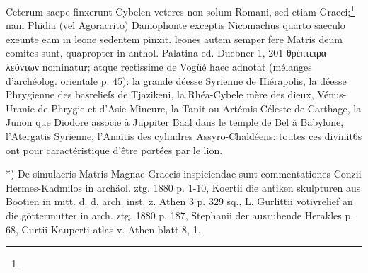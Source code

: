 \documentclass[a4paper, 11pt, oneside, polutonikogreek, german]{article}
\begin{document}
Ceterum saepe finxerunt Cybelen veteres non solum Romani, sed etiam Graeci;\footnote{} nam Phidia (vel Agoracrito) Damophonte exceptis Nicomachus quarto saeculo exeunte eam in leone sedentem pinxit. leones autem semper fere Matris deum comites sunt, quapropter in anthol. Palatina ed. Duebner 1, 201 θρέπτειρα λεόντων nominatur; atque rectissime de Vogüé haec adnotat (mélanges d'archéolog. orientale p. 45): la grande déesse Syrienne de Hiérapolis, la déesse Phrygienne des basreliefs de Tjazikeni, la Rhéa-Cybele mère des dieux, Vénus-Uranie de Phrygie et d'Asie-Mineure, la Tanit ou Artémis Céleste de Carthage, la Junon que Diodore associe à Juppiter Baal dans le temple de Bel à Babylone, l'Atergatis Syrienne, l'Anaïtis des cylindres Assyro-Chaldéens: toutes ces divinit6s ont pour caractéristique d'être portées par le lion.

*) De simulacris Matris Magnae Graecis inspiciendae sunt commentationes Conzii Hermes-Kadmilos in archäol. ztg. 1880 p. 1-10, Koertii die antiken skulpturen aus Böotien in mitt. d. d. arch. inst. z. Athen 3 p. 329 sq., L. Gurlittii votivrelief an die göttermutter in arch. ztg. 1880 p. 187, Stephanii der ausruhende Herakles p. 68, Curtii-Kauperti atlas v. Athen blatt 8, 1.
\end{document}
